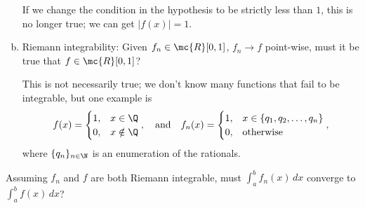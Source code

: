 \begin{enumerate}[(a)]
	\medskip
	
	If we change the condition in the hypothesis to be strictly less than \(1\), this is no longer true; we can get \(|f(x)|=1\).
	
	\item Riemann integrability: Given \(f_n\in\mc{R}[0,1]\), \(f_n\to f\) point-wise, must it be true that \(f\in\mc{R}[0,1]\)?
	
	\medskip
	
	This is not necessarily true; we don't know many functions that fail to be integrable, but one example is 
	\begin{equation*}
		f(x)=\begin{cases}
				1,&x\in\Q\\
				0,&x\notin\Q
			 \end{cases},\quad\text{and}\quad f_n(x)=\begin{cases}
			 											1,&x\in\{q_1,q_2,\dots,q_n\}\\
			 											0,&\text{otherwise}
			 										 \end{cases},
	\end{equation*}
	where \(\{q_n\}_{n\in\N}\) is an enumeration of the rationals.
\end{enumerate}

\begin{fft}
	Assuming \(f_n\) and \(f\) are both Riemann integrable, must \(\displaystyle\int_a^b f_n(x) \, dx\) converge to \(\displaystyle\int_a^b f(x) \, dx\)?
\end{fft}